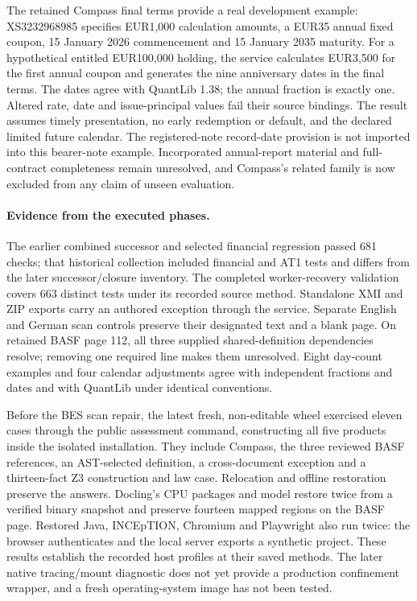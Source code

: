 The retained Compass final terms provide a real development example:
XS3232968985 specifies EUR1,000 calculation amounts, a EUR35 annual fixed coupon,
15 January 2026 commencement and 15 January 2035 maturity.  For a hypothetical
entitled EUR100,000 holding, the service calculates EUR3,500 for the first
annual coupon and generates the nine anniversary dates in the final terms.
The dates agree with QuantLib 1.38; the annual fraction is exactly one.  Altered
rate, date and issue-principal values fail their source bindings.  The result
assumes timely presentation, no early redemption or default, and the declared
limited future calendar.  The registered-note record-date provision is not
imported into this bearer-note example.  Incorporated annual-report material
and full-contract completeness remain unresolved, and Compass's related family
is now excluded from any claim of unseen evaluation.

\paragraph{Evidence from the executed phases.}
The earlier combined successor and selected financial regression passed 681
checks; that historical collection included financial and AT1 tests and differs
from the later successor/closure inventory.  The completed worker-recovery
validation covers 663 distinct tests under its recorded source method.
Standalone XMI and ZIP exports carry an authored exception through the service.
Separate English and German scan controls preserve their designated text and a
blank page.  On retained BASF page 112, all three supplied shared-definition
dependencies resolve; removing one required line makes them unresolved.  Eight
day-count examples and four calendar adjustments agree with independent
fractions and dates and with QuantLib under identical conventions.

Before the BES scan repair, the latest fresh, non-editable wheel exercised
eleven cases through the public assessment command, constructing all five
products inside the isolated installation.
They include Compass, the three reviewed BASF references, an AST-selected
definition, a cross-document exception and a thirteen-fact Z3 construction and
law case.  Relocation and offline
restoration preserve the answers.  Docling's CPU packages and model restore
twice from a verified binary snapshot and preserve fourteen mapped regions on
the BASF page.  Restored Java, INCEpTION, Chromium and Playwright also run twice:
the browser authenticates and the local server exports a synthetic project.
These results establish the recorded host profiles at their saved methods.
The later native tracing/mount diagnostic does not yet provide a production
confinement wrapper, and a fresh operating-system image has not been tested.

